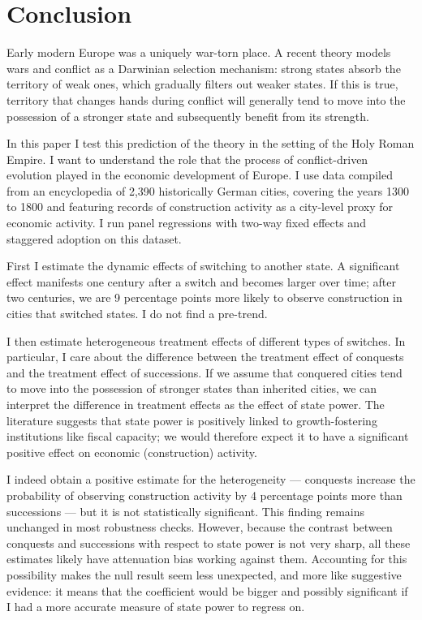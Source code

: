 \documentclass[11pt, a4paper]{article}
\begin{document}

\section{Conclusion} \label{sec:conclusion}

Early modern Europe was a uniquely war-torn place. A recent theory models wars and conflict as a Darwinian selection mechanism: strong states absorb the territory of weak ones, which gradually filters out weaker states. If this is true, territory that changes hands during conflict will generally tend to move into the possession of a stronger state and subsequently benefit from its strength. 

In this paper I test this prediction of the theory in the setting of the Holy Roman Empire. I want to understand the role that the process of conflict-driven evolution played in the economic development of Europe. I use data compiled from an encyclopedia of 2,390 historically German cities, covering the years 1300 to 1800 and featuring records of construction activity as a city-level proxy for economic activity. I run panel regressions with two-way fixed effects and staggered adoption on this dataset. 

First I estimate the dynamic effects of switching to another state. A significant effect manifests one century after a switch and becomes larger over time; after two centuries, we are 9 percentage points more likely to observe construction in cities that switched states. I do not find a pre-trend.

I then estimate heterogeneous treatment effects of different types of switches. In particular, I care about the difference between the treatment effect of conquests and the treatment effect of successions. If we assume that conquered cities tend to move into the possession of stronger states than inherited cities, we can interpret the difference in treatment effects as the effect of state power. The literature suggests that state power is positively linked to growth-fostering institutions like fiscal capacity; we would therefore expect it to have a significant positive effect on economic (construction) activity.

I indeed obtain a positive estimate for the heterogeneity --- conquests increase the probability of observing construction activity by 4 percentage points more than successions --- but it is not statistically significant. This finding remains unchanged in most robustness checks. 
However, because the contrast between conquests and successions with respect to state power is not very sharp, all these estimates likely have attenuation bias working against them. Accounting for this possibility makes the null result seem less unexpected, and more like suggestive evidence: it means that the coefficient would be bigger and possibly significant if I had a more accurate measure of state power to regress on. 
\end{document}
